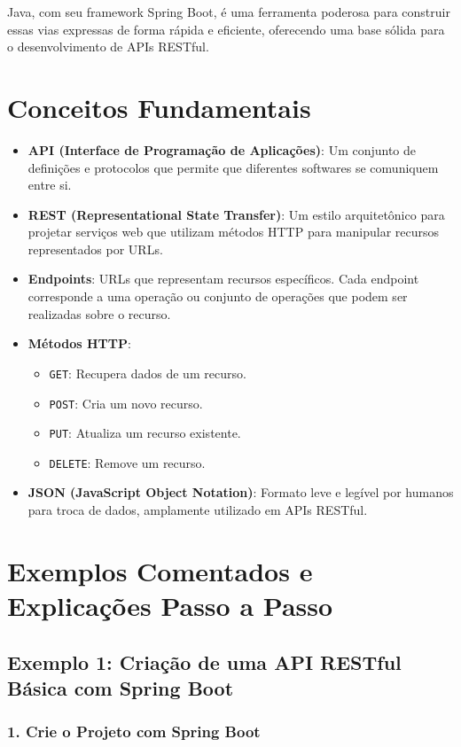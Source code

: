 \documentclass[a4paper,12pt]{book}
\begin{document}
Java, com seu framework Spring Boot, é uma ferramenta poderosa para construir essas vias expressas de forma rápida e eficiente, oferecendo uma base sólida para o desenvolvimento de APIs RESTful.

\section{Conceitos Fundamentais}

\begin{itemize}
    \item \textbf{API (Interface de Programação de Aplicações)}: Um conjunto de definições e protocolos que permite que diferentes softwares se comuniquem entre si.
    \item \textbf{REST (Representational State Transfer)}: Um estilo arquitetônico para projetar serviços web que utilizam métodos HTTP para manipular recursos representados por URLs.
    \item \textbf{Endpoints}: URLs que representam recursos específicos. Cada endpoint corresponde a uma operação ou conjunto de operações que podem ser realizadas sobre o recurso.
    \item \textbf{Métodos HTTP}:
    \begin{itemize}
        \item \texttt{GET}: Recupera dados de um recurso.
        \item \texttt{POST}: Cria um novo recurso.
        \item \texttt{PUT}: Atualiza um recurso existente.
        \item \texttt{DELETE}: Remove um recurso.
    \end{itemize}
    \item \textbf{JSON (JavaScript Object Notation)}: Formato leve e legível por humanos para troca de dados, amplamente utilizado em APIs RESTful.
\end{itemize}

\section{Exemplos Comentados e Explicações Passo a Passo}

\subsection{Exemplo 1: Criação de uma API RESTful Básica com Spring Boot}

\subsubsection{1. Crie o Projeto com Spring Boot}
\end{document}
